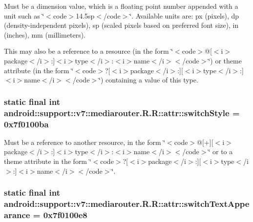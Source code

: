 Must be a dimension value, which is a floating point number appended with a unit such as \char`\"{}$<$code$>$14.5sp$<$/code$>$\char`\"{}. Available units are: px (pixels), dp (density-independent pixels), sp (scaled pixels based on preferred font size), in (inches), mm (millimeters). 

This may also be a reference to a resource (in the form \char`\"{}$<$code$>$@\mbox{[}$<$i$>$package$<$/i$>$:\mbox{]}$<$i$>$type$<$/i$>$:$<$i$>$name$<$/i$>$$<$/code$>$\char`\"{}) or theme attribute (in the form \char`\"{}$<$code$>$?\mbox{[}$<$i$>$package$<$/i$>$:\mbox{]}\mbox{[}$<$i$>$type$<$/i$>$:\mbox{]}$<$i$>$name$<$/i$>$$<$/code$>$\char`\"{}) containing a value of this type. \hypertarget{classandroid_1_1support_1_1v7_1_1mediarouter_1_1_r_1_1attr_54686827b90a1f2aae872c4d557f71b3}{
\subsubsection[{switchStyle}]{\setlength{\rightskip}{0pt plus 5cm}static final int android::support::v7::mediarouter.R.R::attr::switchStyle = 0x7f0100ba}}
\label{classandroid_1_1support_1_1v7_1_1mediarouter_1_1_r_1_1attr_54686827b90a1f2aae872c4d557f71b3}


Must be a reference to another resource, in the form \char`\"{}$<$code$>$@\mbox{[}+\mbox{]}\mbox{[}$<$i$>$package$<$/i$>$:\mbox{]}$<$i$>$type$<$/i$>$:$<$i$>$name$<$/i$>$$<$/code$>$\char`\"{} or to a theme attribute in the form \char`\"{}$<$code$>$?\mbox{[}$<$i$>$package$<$/i$>$:\mbox{]}\mbox{[}$<$i$>$type$<$/i$>$:\mbox{]}$<$i$>$name$<$/i$>$$<$/code$>$\char`\"{}. \hypertarget{classandroid_1_1support_1_1v7_1_1mediarouter_1_1_r_1_1attr_46bd5d222736fa57f299d3c261acc437}{
\subsubsection[{switchTextAppearance}]{\setlength{\rightskip}{0pt plus 5cm}static final int android::support::v7::mediarouter.R.R::attr::switchTextAppearance = 0x7f0100e8}}
\label{classandroid_1_1support_1_1v7_1_1mediarouter_1_1_r_1_1attr_46bd5d222736fa57f299d3c261acc437}


